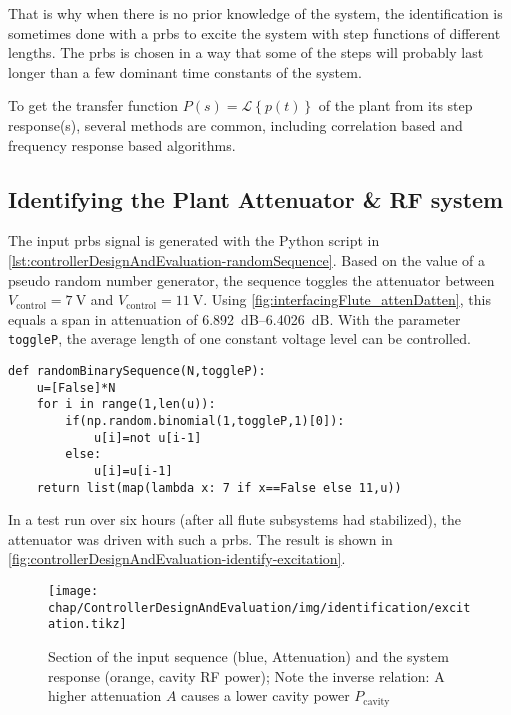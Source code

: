 That is why when there is no prior knowledge of the system, the identification is sometimes done with a \gls{prbs} to excite the system with step functions of different lengths. The \gls{prbs} is chosen in a way that some of the steps will probably last longer than a few dominant time constants of the system. 

To get the transfer function $P(s)=\mathcal{L}\left\{p(t)\right\}$ of the plant from its step response(s), several methods are common, including correlation based and frequency response based algorithms.

\subsection{Identifying the Plant Attenuator \& RF system}
The input \gls{prbs} signal is generated with the Python script in \autoref{lst:controllerDesignAndEvaluation-randomSequence}.
Based on the value of a pseudo random number generator, the sequence toggles the attenuator between $V_\text{control}=\SI{7}{\volt}$ and $V_\text{control}=\SI{11}{\volt}$.
Using \autoref{fig:interfacingFlute_attenDatten}, this equals a span in attenuation of \SIrange{6.892}{6.4026}{\dB}.
With the parameter \texttt{toggleP}, the average length of one constant voltage level can be controlled. 

\begin{lstlisting}[style=python,caption = Function to get a pseudo random binary sequence, label = lst:controllerDesignAndEvaluation-randomSequence]
def randomBinarySequence(N,toggleP):
    u=[False]*N
    for i in range(1,len(u)):
        if(np.random.binomial(1,toggleP,1)[0]):
            u[i]=not u[i-1]
        else:
            u[i]=u[i-1]
    return list(map(lambda x: 7 if x==False else 11,u))
\end{lstlisting}

In a test run over six hours (after all \gls{flute} subsystems had stabilized), the attenuator was driven with such a \gls{prbs}. The result is shown in \autoref{fig:controllerDesignAndEvaluation-identify-excitation}.

\begin{figure}[tb]
	\centering
	\texttt{[image: chap/ControllerDesignAndEvaluation/img/identification/excitation.tikz]}
	\caption[Identification sequence and response]{Section of the input sequence (blue, Attenuation) and the system response (orange, cavity RF power); Note the inverse relation: A higher attenuation $A$ causes a lower cavity power $P_\text{cavity}$}
	\label{fig:controllerDesignAndEvaluation-identify-excitation}
\end{figure}

